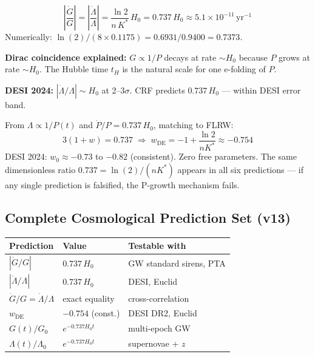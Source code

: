 \documentclass[12pt, a4paper]{article}
\begin{document}
\begin{keybox}[title={Cosmic Variation Rate --- Zero Free Parameters}]
\[
  \boxed{\left|\frac{\dot{G}}{G}\right| = \left|\frac{\dot{\Lambda}}{\Lambda}\right|
  = \frac{\ln 2}{n\,K^*}\,H_0 = 0.737\,H_0 \approx 5.1\times 10^{-11}\,\mathrm{yr}^{-1}}
\]
Numerically: $\ln(2)/(8\times 0.1175) = 0.6931/0.9400 = 0.7373$.

\textbf{Dirac coincidence explained:} $G\propto 1/P$ decays at rate $\sim H_0$ because
$P$ grows at rate $\sim H_0$. The Hubble time $t_H$ is the natural scale for one e-folding of $P$.

\textbf{DESI 2024:} $|\dot{\Lambda}/\Lambda|\sim H_0$ at 2--3$\sigma$.
CRF predicts $0.737\,H_0$ --- within DESI error band.
\end{keybox}

\begin{derivedbox}[title={Dark Energy Equation of State $w_{\mathrm{DE}} = -0.754$}]
From $\Lambda\propto 1/P(t)$ and $\dot{P}/P = 0.737\,H_0$, matching to FLRW:
\[
  3(1+w) = 0.737 \;\Rightarrow\;
  \boxed{w_{\mathrm{DE}} = -1 + \frac{\ln 2}{nK^*} \approx -0.754}
\]
DESI 2024: $w_0 \approx -0.73$ to $-0.82$ (consistent).
Zero free parameters. The same dimensionless ratio $0.737 = \ln(2)/(nK^*)$ appears
in all six predictions --- if any single prediction is falsified, the P-growth mechanism fails.
\end{derivedbox}

\subsection{Complete Cosmological Prediction Set (v13)}

\begin{center}
\renewcommand{\arraystretch}{1.3}
\begin{tabular}{p{3cm} p{3.3cm} p{6cm}}
\toprule
\textbf{Prediction} & \textbf{Value} & \textbf{Testable with} \\
\midrule
$|\dot{G}/G|$ & $0.737\,H_0$ & GW standard sirens, PTA \\
$|\dot{\Lambda}/\Lambda|$ & $0.737\,H_0$ & DESI, Euclid \\
$\dot{G}/G = \dot{\Lambda}/\Lambda$ & exact equality & cross-correlation \\
$w_{\mathrm{DE}}$ & $-0.754$ (const.) & DESI DR2, Euclid \\
$G(t)/G_0$ & $e^{-0.737 H_0 t}$ & multi-epoch GW \\
$\Lambda(t)/\Lambda_0$ & $e^{-0.737 H_0 t}$ & supernovae + $z$ \\
\bottomrule
\end{tabular}
\end{center}
\end{document}
